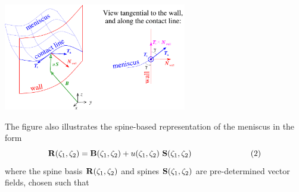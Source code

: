  
\begin{DoxyImage}
\includegraphics[width=0.6\textwidth]{contact_angle_sketch}
\end{DoxyImage}


The figure also illustrates the spine-\/based representation of the meniscus in the form \[ {\bf R}(\zeta_1,\zeta_2) = {\bf B}(\zeta_1,\zeta_2) + u(\zeta_1,\zeta_2) \ {\bf S}(\zeta_1,\zeta_2) \ \ \ \ \ \ \ \ \ \ \ \ \ \ \ \ \ \ \ \ \ \ (2) \] where the spine basis ${\bf R}(\zeta_1,\zeta_2)$ and spines ${\bf S}(\zeta_1,\zeta_2)$ are pre-\/determined vector fields, chosen such that ~\newline


